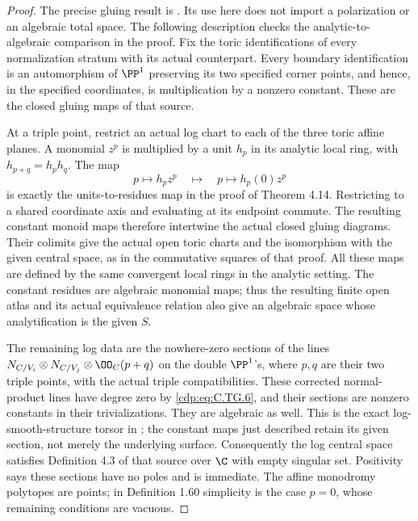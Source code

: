 \begin{proof}
The precise gluing result is
\cite[Theorems 4.14, 5.2 and 5.4]{GrossSiebert2006I}.
Its use here does not import a polarization or an
algebraic total space. The following description
checks the analytic-to-algebraic comparison in the
proof. Fix the toric identifications of every
normalization stratum with its actual counterpart.
Every boundary identification is an automorphism
of $\PP^1$ preserving its two specified corner
points, and hence, in the specified coordinates,
is multiplication by a nonzero constant. These
are the closed gluing maps of that source.

At a triple point, restrict an actual log chart
to each of the three toric affine planes. A
monomial $z^p$ is multiplied by a unit $h_p$
in its analytic local ring, with
$h_{p+q}=h_ph_q$. The map
\[
       p\longmapsto h_pz^p
       \quad\longmapsto\quad
       p\longmapsto h_p(0)z^p
\tag{C.TG.9}\label{cdp:eq:C.TG.9}
\]
is exactly the units-to-residues map in the proof
of Theorem 4.14. Restricting to a shared coordinate
axis and evaluating at its endpoint commute.
The resulting constant monoid maps therefore
intertwine the actual closed gluing diagrams.
Their colimits give the actual open toric charts
and the isomorphism with the given central space,
as in the commutative squares of that proof.
All these maps are defined by the same convergent
local rings in the analytic setting. The constant
residues are algebraic monomial maps; thus the
resulting finite open atlas and its actual
equivalence relation also give an algebraic
space whose analytification is the given $S$.

The remaining log data are the nowhere-zero
sections of the lines
$N_{C/V_i}\otimes N_{C/V_j}\otimes\OO_C(p+q)$
on the double $\PP^1$'s, where $p,q$ are their
two triple points, with the actual triple
compatibilities. These corrected normal-product
lines have degree zero by \eqref{cdp:eq:C.TG.6}, and
their sections are nonzero constants in their
trivializations. They are algebraic as well.
This is the exact log-smooth-structure torsor
in \cite[Example 3.30 and Theorem 3.22]{GrossSiebert2006I};
the constant maps just described retain its
given section, not merely the underlying surface.
Consequently the log central space satisfies
Definition 4.3 of that source over $\C$ with
empty singular set. Positivity says these
sections have no poles and is immediate.
The affine monodromy polytopes are points;
in Definition 1.60 simplicity is the case
$p=0$, whose remaining conditions are vacuous.


\end{proof}
